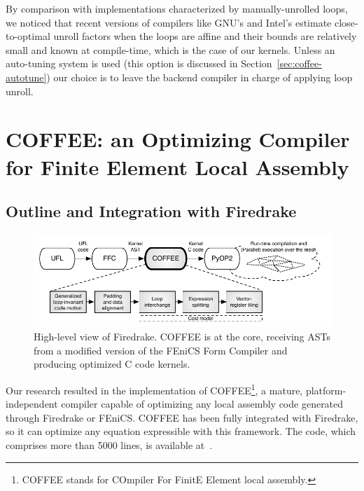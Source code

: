 By comparison with implementations characterized by manually-unrolled loops, we noticed that recent versions of compilers like GNU's and Intel's estimate close-to-optimal unroll factors when the loops are affine and their bounds are relatively small and known at compile-time, which is the case of our kernels. Unless an auto-tuning system is used (this option is discussed in Section~\ref{sec:coffee-autotune}) our choice is to leave the backend compiler in charge of applying loop unroll. 


\section{COFFEE: an Optimizing Compiler for Finite Element Local Assembly}
\label{sec:coffee-implementation}
\subsection{Outline and Integration with Firedrake}

\begin{figure}
\begin{center}
\includegraphics[scale=0.70]{coffee/pictures/coffee-pipeline.pdf}
\caption{High-level view of Firedrake. COFFEE is at the core, receiving ASTs from a modified version of the FEniCS Form Compiler and producing optimized C code kernels.}
\label{fig:coffee-pipeline}
\end{center}
\end{figure}

Our research resulted in the implementation of COFFEE\footnote{COFFEE stands for COmpiler For FinitE Element local assembly.}, a mature, platform-independent compiler capable of optimizing any local assembly code generated through Firedrake or FEniCS. COFFEE has been fully integrated with Firedrake, so it can optimize any equation expressible with this framework. The code, which comprises more than 5000 lines, is available at~\citep{coffee-implementation}.

